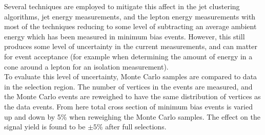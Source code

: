 Several techniques are employed to mitigate this affect in the jet clustering algorithms, jet energy measurements, and the lepton energy measurements with most of the techniques reducing to some level of subtracting an average ambient energy which has been measured in minimum bias events. However, this still produces some level of uncertainty in the current measurements, and can matter for event acceptance (for example when determining the amount of energy in a cone around a lepton for an isolation measurement).\\

To evaluate this level of uncertainty, Monte Carlo samples are compared to data in the selection region. The number of vertices in the events are measured, and the Monte Carlo events are reweighed to have the same distribution of vertices as the data events. From here total cross section of minimum bias events is varied up and down by 5\% when reweighing the Monte Carlo samples. The effect on the signal yield is found to be $\pm 5\%$ after full selections.